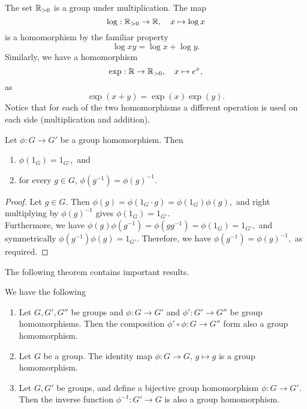 \begin{example}
  The set $\mathbb R_{>0}$ is a group under multiplication. The map $$\log :\mathbb R_{>0}\to
  \mathbb R,\quad x\mapsto \log x$$ is a homomorphism by the familiar property $$\log xy = \log x + \log y.$$ Similarly, we have a
  homomorphism $$\exp :\mathbb R\to\mathbb R_{>0} ,\quad x\mapsto e^{x},$$ as $$\exp(x+y)=\exp(x)\exp(y).$$ Notice that for each of the two homomorphisms a different operation is used on each side (multiplication and addition).
\end{example}

\begin{theorem}
  Let $\phi:G\to G'$ be a group homomorphism. Then
  \begin{enumerate}
    \item $\phi(1_G)=1_{G'},$ and
    \item for every $g\in G$, $\phi(g^{-1})= \phi(g)^{-1}.$
  \end{enumerate}
  \label{homIdInv}
\end{theorem}
\begin{proof}
    Let $g \in G$. Then
    $\phi(g) = \phi(1_G\cdot g) = \phi(1_G)\phi(g),$
    and right multiplying by $\phi(g)^{-1}$ gives $\phi(1_G) = 1_{G'}.$ 
    \\ Furthermore, we have
    $\phi(g)\phi(g^{-1}) = \phi(gg^{-1}) = \phi(1_G) = 1_{G'},$
    and symmetrically $\phi(g^{-1})\phi(g) = 1_{G'}.$ Therefore, we have
    $\phi(g^{-1}) = \phi(g)^{-1},$ 
    as required.
\end{proof}
The following theorem contains important results.
\begin{theorem}
  We have the following
  \begin{enumerate}
    \item Let $G,G',G''$ be groups and $\phi:G\to G'$ and $\phi':G'\to G''$ be group
      homomorphisms. Then the composition $\phi'\circ\phi:G\to G''$ form also a group
      homomorphism.
    \item Let $G$ be a group. The identity map $\phi:G\to G$, $g \mapsto g$ is a group
      homomorphism.
    \item Let $G,G'$ be groups, and define a bijective group homomorphism $\phi:G\to G'$.
      Then the inverse function $\phi^{-1}:G'\to G$ is also a group homomorphism.
  \end{enumerate}
  \label{groupsCategories}
\end{theorem}
